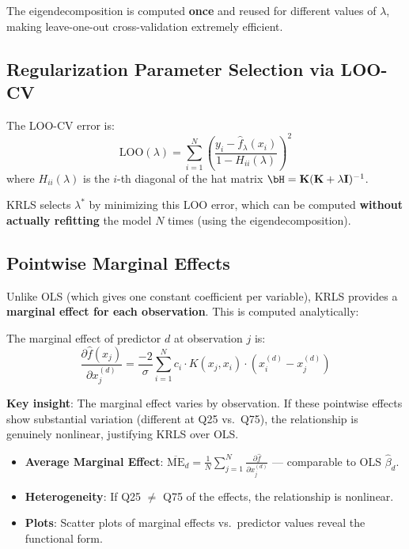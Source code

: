 \begin{examplebox}
The eigendecomposition is computed \textbf{once} and reused for different values of $\lambda$, making leave-one-out cross-validation extremely efficient.
\end{examplebox}

\subsection{Regularization Parameter Selection via LOO-CV}

\begin{definitionbox}
The LOO-CV error is:
\begin{equation}
\text{LOO}(\lambda) = \sum_{i=1}^{N} \left(\frac{y_i - \hat{f}_\lambda(x_i)}{1 - H_{ii}(\lambda)}\right)^2
\end{equation}
where $H_{ii}(\lambda)$ is the $i$-th diagonal of the hat matrix $\bH = \bK(\bK + \lambda \bI)^{-1}$.
\end{definitionbox}

KRLS selects $\lambda^*$ by minimizing this LOO error, which can be computed \textbf{without actually refitting} the model $N$ times (using the eigendecomposition).

\subsection{Pointwise Marginal Effects}

Unlike OLS (which gives one constant coefficient per variable), KRLS provides a \textbf{marginal effect for each observation}. This is computed analytically:

\begin{theorembox}
The marginal effect of predictor $d$ at observation $j$ is:
\begin{equation}
\frac{\partial \hat{f}(x_j)}{\partial x_j^{(d)}} = \frac{-2}{\sigma} \sum_{i=1}^{N} c_i \cdot K(x_j, x_i) \cdot \left(x_i^{(d)} - x_j^{(d)}\right)
\label{eq:deriv}
\end{equation}
\end{theorembox}

\textbf{Key insight}: The marginal effect varies by observation. If these pointwise effects show substantial variation (different at Q25 vs.\ Q75), the relationship is genuinely nonlinear, justifying KRLS over OLS.

\begin{examplebox}
\begin{itemize}[leftmargin=1.5em]
\item \textbf{Average Marginal Effect}: $\overline{\text{ME}}_d = \frac{1}{N}\sum_{j=1}^{N} \frac{\partial \hat{f}}{\partial x_j^{(d)}}$ --- comparable to OLS $\hat{\beta}_d$.
\item \textbf{Heterogeneity}: If Q25 $\neq$ Q75 of the effects, the relationship is nonlinear.
\item \textbf{Plots}: Scatter plots of marginal effects vs.\ predictor values reveal the functional form.
\end{itemize}
\end{examplebox}

